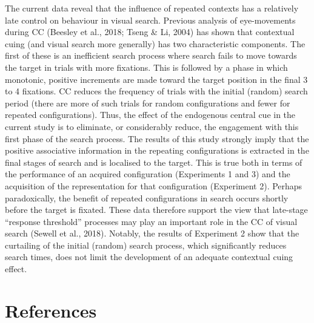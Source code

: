 \documentclass[
  man,floatsintext]{apa7}
\begin{document}
The current data reveal that the influence of repeated contexts has a relatively late control on behaviour in visual search. Previous analysis of eye-movements during CC (Beesley et al., 2018; Tseng \& Li, 2004) has shown that contextual cuing (and visual search more generally) has two characteristic components. The first of these is an inefficient search process where search fails to move towards the target in trials with more fixations. This is followed by a phase in which monotonic, positive increments are made toward the target position in the final 3 to 4 fixations. CC reduces the frequency of trials with the initial (random) search period (there are more of such trials for random configurations and fewer for repeated configurations). Thus, the effect of the endogenous central cue in the current study is to eliminate, or considerably reduce, the engagement with this first phase of the search process. The results of this study strongly imply that the positive associative information in the repeating configurations is extracted in the final stages of search and is localised to the target. This is true both in terms of the performance of an acquired configuration (Experiments 1 and 3) and the acquisition of the representation for that configuration (Experiment 2). Perhaps paradoxically, the benefit of repeated configurations in search occurs shortly before the target is fixated. These data therefore support the view that late-stage ``response threshold'' processes may play an important role in the CC of visual search (Sewell et al., 2018). Notably, the results of Experiment 2 show that the curtailing of the initial (random) search process, which significantly reduces search times, does not limit the development of an adequate contextual cuing effect.

\newpage

\newpage

\hypertarget{references}{%
\section*{References}\label{references}}
\end{document}
